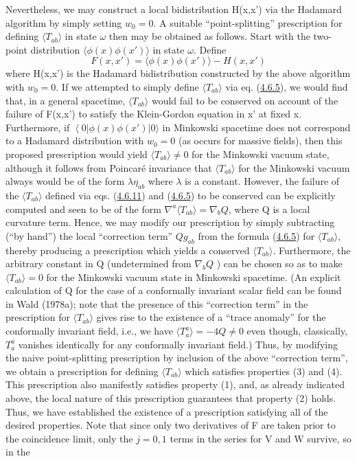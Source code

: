 \documentclass[11pt,a4paper]{article}
\providecommand{\bra}[1]{\left\langle#1\right\rvert}
\begin{document}
Nevertheless, we may construct a local bidistribution H(x,x') via the Hadamard algorithm by simply setting \(w_0=0\). A suitable ``point-splitting'' prescription for defining \(\langle T_{ab}\rangle \) in state \(\omega\) then may be obtained as follows. Start with the two-point distribution \(\langle \phi(x)\phi(x')\rangle \) in state \(\omega\). Define
\begin{equation*}
F(x,x') = \langle \phi(x)\phi(x') \rangle - H(x,x') \tag{4.6.11}\label{eq:4.6.11}
\end{equation*}
where H(x,x') is the Hadamard bidistribution constructed by the above algorithm with \(w_0 = 0\). If we attempted to simply define \(\langle T_{ab} \rangle\) via eq. (\hyperref[eq:4.6.5]{4.6.5}), we would find that, in a general spacetime, \(\langle T_{ab} \rangle\) would fail to be conserved on account of the failure of F(x,x') to satisfy the Klein-Gordon equation in x' at fixed x. Furthermore, if \(\bra0 \phi(x)\phi(x')\lvert 0\rangle \) in Minkowski spacetime does not correspond to a Hadamard distribution with \(w_0 = 0\) (as occurs for massive fields), then this proposed prescription would yield \(\langle T_{ab} \rangle \neq 0\) for the Minkowski vacuum state, although it follows from Poincaré invariance that \(\langle T_{ab}\rangle\) for the Minkowski vacuum always would be of the form \(\lambda \eta_{ab}\) where \(\lambda\) is a constant. However, the failure of the \(\langle T_{ab} \rangle\) defined via eqs. (\hyperref[eq:4.6.11]{4.6.11}) and (\hyperref[eq:4.6.5]{4.6.5}) to be conserved can be explicitly computed and seen to be of the form \(\nabla^a \langle T_{ab}\rangle = \nabla_b Q\), where Q is a local curvature term. Hence, we may modify our prescription by simply subtracting (``by hand'') the local ``correction term'' \(Qg_{ab}\) from the formula (\hyperref[eq:4.6.5]{4.6.5}) for \(\langle T_{ab} \rangle\), thereby producing a prescription which yields a conserved \(\langle T_{ab} \rangle\). Furthermore, the arbitrary constant in Q (undetermined from \(\nabla_b Q\) ) can be chosen so as to make \(\langle T_{ab} \rangle = 0\) for \hypertarget{source-107}{} the Minkowski vacuum state in Minkowski spacetime. (An explicit calculation of Q for the case of a conformally invariant scalar field can be found in Wald (1978a); note that the presence of this ``correction term'' in the prescription for \(\langle T_{ab}\rangle\) gives rise to the existence of a ``trace anomaly'' for the conformally invariant field, i.e., we have \(\langle T_a^a \rangle = -4Q \neq 0\) even though, classically, \(T_a^a\) vanishes identically for any conformally invariant field.) Thus, by modifying the naive point-splitting prescription by inclusion of the above ``correction term'', we obtain a prescription for defining \(\langle T_{ab} \rangle\) which satisfies properties (3) and (4). This prescription also manifestly satisfies property (1), and, as already indicated above, the local nature of this prescription guarantees that property (2) holds. Thus, we have established the existence of a prescription satisfying all of the desired properties. Note that since only two derivatives of F are taken prior to the coincidence limit, only the \(j=0,1\) terms in the series for V and W survive, so in the 
\end{document}
